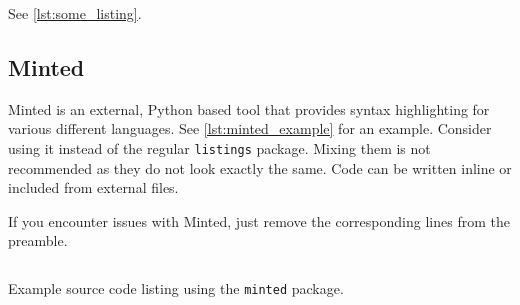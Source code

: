 See \cref{lst:some_listing}.



\subsection{Minted}

Minted is an external, Python based tool that provides syntax highlighting for various different languages.
See \cref{lst:minted_example} for an example.
Consider using it instead of the regular \texttt{listings} package.
Mixing them is not recommended as they do not look exactly the same.
Code can be written inline or included from external files.

If you encounter issues with Minted, just remove the corresponding lines from the preamble.

\begin{listing}
	\capstart
	\inputminted{haskell}{code/sample.hs}
	\caption{Example source code listing using the \texttt{minted} package.}
	\label{lst:minted_example}
\end{listing}
